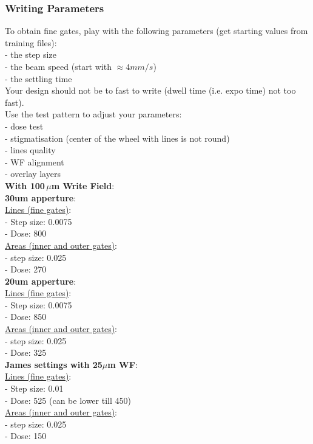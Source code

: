 \documentclass[12pt,a4paper]{report}
\begin{document}
\begin{enumerate}
\subsubsection{Writing Parameters }

To obtain fine gates, play with the following parameters (get starting values from training files):\\
- the step size\\
- the beam speed (start with $\approx 4 mm/s$)\\
- the settling time\\

Your design should not be to fast to write (dwell time (i.e. expo time) not too fast).\\


Use the test pattern to adjust your parameters:\\
- dose test\\
- stigmatisation (center of the wheel with lines is not round)\\
- lines quality\\
- WF alignment\\
- overlay layers\\

\textbf{With 100\,$\mu$m Write Field}:\\

\textbf{30um apperture}:\\

\noindent \underline{Lines (fine gates)}:\\
- Step size: 0.0075\\
- Dose: 800 \\
\underline{Areas (inner and outer gates)}:\\
- step size: 0.025 \\
- Dose: 270\\


\textbf{20um apperture}:\\

\noindent \underline{Lines (fine gates)}:\\
- Step size: 0.0075\\
- Dose: 850 \\
\underline{Areas (inner and outer gates)}:\\
- step size: 0.025 \\
- Dose: 325\\


\textbf{James settings with 25$\mu$m WF}:\\
\underline{Lines (fine gates)}:\\
- Step size: 0.01\\
- Dose: 525 (can be lower till 450)\\
\underline{Areas (inner and outer gates)}:\\
- step size: 0.025 \\
- Dose: 150\\





\end{enumerate}
\end{document}
